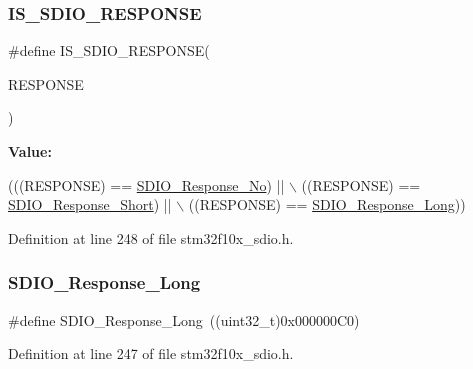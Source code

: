 \subsubsection{\texorpdfstring{I\+S\+\_\+\+S\+D\+I\+O\+\_\+\+R\+E\+S\+P\+O\+N\+SE}{IS\_SDIO\_RESPONSE}}
{\footnotesize\ttfamily \#define I\+S\+\_\+\+S\+D\+I\+O\+\_\+\+R\+E\+S\+P\+O\+N\+SE(\begin{DoxyParamCaption}\item[{}]{R\+E\+S\+P\+O\+N\+SE }\end{DoxyParamCaption})}

{\bfseries Value\+:}
\begin{DoxyCode}
(((RESPONSE) == \hyperlink{group___s_d_i_o___response___type_ga308b8ef0e79ba451644dda923bb3ac41}{SDIO\_Response\_No}) || \(\backslash\)
                                    ((RESPONSE) == \hyperlink{group___s_d_i_o___response___type_ga1f61768f90641648fd5c12e8d2f7e508}{SDIO\_Response\_Short}) || \(\backslash\)
                                    ((RESPONSE) == \hyperlink{group___s_d_i_o___response___type_ga1a11a8750612b344214f846784046bb0}{SDIO\_Response\_Long}))
\end{DoxyCode}


Definition at line 248 of file stm32f10x\+\_\+sdio.\+h.

\mbox{\label{group___s_d_i_o___response___type_ga1a11a8750612b344214f846784046bb0}} 
\subsubsection{\texorpdfstring{S\+D\+I\+O\+\_\+\+Response\+\_\+\+Long}{SDIO\_Response\_Long}}
{\footnotesize\ttfamily \#define S\+D\+I\+O\+\_\+\+Response\+\_\+\+Long~((uint32\+\_\+t)0x000000\+C0)}



Definition at line 247 of file stm32f10x\+\_\+sdio.\+h.

\mbox{\label{group___s_d_i_o___response___type_ga308b8ef0e79ba451644dda923bb3ac41}} 
